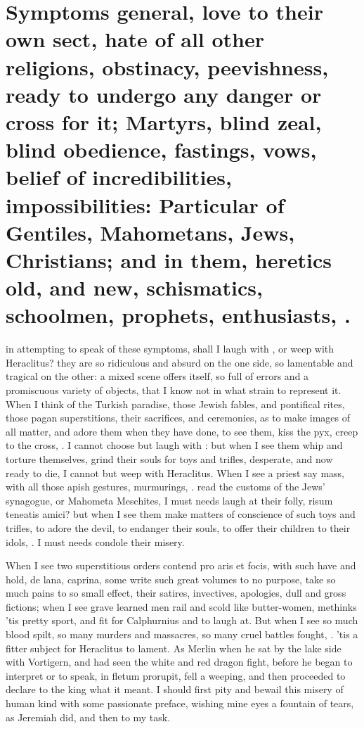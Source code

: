 {%
\section[Symptoms general]{Symptoms general, love to their own sect, hate of all other religions, obstinacy, peevishness, ready to undergo any danger or cross for it; Martyrs, blind zeal, blind obedience, fastings, vows, belief of incredibilities, impossibilities: Particular of Gentiles, Mahometans, Jews, Christians; and in them, heretics old, and new, schismatics, schoolmen, prophets, enthusiasts, \etc{}.}

 in attempting to speak of these
symptoms, shall I laugh with \Democritus{}, or weep with Heraclitus? they
are so ridiculous and absurd on the one side, so lamentable and
tragical on the other: a mixed scene offers itself, so full of errors
and a promiscuous variety of objects, that I know not in what strain to
represent it. When I think of the Turkish paradise, those Jewish
fables, and pontifical rites, those pagan superstitions, their
sacrifices, and ceremonies, as to make images of all matter, and adore
them when they have done, to see them, kiss the pyx, creep to the
cross, \etc{}. I cannot choose but laugh with \Democritus{}: but when I see
them whip and torture themselves, grind their souls for toys and
trifles, desperate, and now ready to die, I cannot but weep with
Heraclitus. When I see a priest say mass, with all those apish
gestures, murmurings, \etc{}. read the customs of the Jews' synagogue, or
Mahometa Meschites, I must needs laugh at their folly, risum
teneatis amici? but when I see them make matters of conscience of such
toys and trifles, to adore the devil, to endanger their souls, to offer
their children to their idols, \etc{}. I must needs condole their misery.

When I see two superstitious orders contend pro aris et focis, with
such have and hold, de lana, caprina, some write such great volumes to
no purpose, take so much pains to so small effect, their satires,
invectives, apologies, dull and gross fictions; when I see grave
learned men rail and scold like butter-women, methinks 'tis pretty
sport, and fit for Calphurnius and \Democritus{} to laugh at. But
when I see so much blood spilt, so many murders and massacres, so many
cruel battles fought, \etc{}. 'tis a fitter subject for Heraclitus to
lament. As Merlin when he sat by the lake side with Vortigern,
and had seen the white and red dragon fight, before he began to
interpret or to speak, in fletum prorupit, fell a weeping, and then
proceeded to declare to the king what it meant. I should first pity and
bewail this misery of human kind with some passionate preface, wishing
mine eyes a fountain of tears, as Jeremiah did, and then to my task.

}
